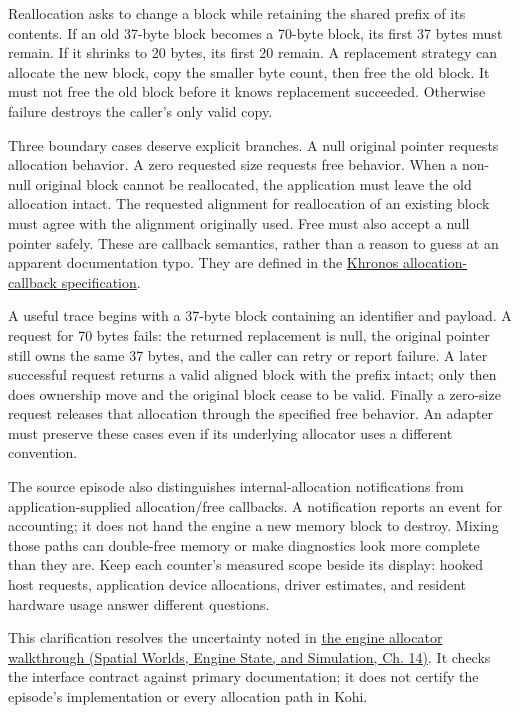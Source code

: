 Reallocation asks to change a block while retaining the shared prefix of its contents. If an old 37-byte block becomes a 70-byte block, its first 37 bytes must remain. If it shrinks to 20 bytes, its first 20 remain. A replacement strategy can allocate the new block, copy the smaller byte count, then free the old block. It must not free the old block before it knows replacement succeeded. Otherwise failure destroys the caller's only valid copy.

Three boundary cases deserve explicit branches. A null original pointer requests allocation behavior. A zero requested size requests free behavior. When a non-null original block cannot be reallocated, the application must leave the old allocation intact. The requested alignment for reallocation of an existing block must agree with the alignment originally used. Free must also accept a null pointer safely. These are callback semantics, rather than a reason to guess at an apparent documentation typo. They are defined in the \href{https://docs.vulkan.org/spec/latest/chapters/memory.html}{Khronos allocation-callback specification}.

A useful trace begins with a 37-byte block containing an identifier and payload. A request for 70 bytes fails: the returned replacement is null, the original pointer still owns the same 37 bytes, and the caller can retry or report failure. A later successful request returns a valid aligned block with the prefix intact; only then does ownership move and the original block cease to be valid. Finally a zero-size request releases that allocation through the specified free behavior. An adapter must preserve these cases even if its underlying allocator uses a different convention.

The source episode also distinguishes internal-allocation notifications from application-supplied allocation/free callbacks. A notification reports an event for accounting; it does not hand the engine a new memory block to destroy. Mixing those paths can double-free memory or make diagnostics look more complete than they are. Keep each counter's measured scope beside its display: hooked host requests, application device allocations, driver estimates, and resident hardware usage answer different questions.

This clarification resolves the uncertainty noted in \href{../05-Spatial-Worlds-Engine-State-and-Simulation/main.pdf\#nameddest=05-engine-i-ch014-bridge-vulkan-allocation-callbacks-to-an-engine-allocator}{the engine allocator walkthrough (Spatial Worlds, Engine State, and Simulation, Ch. 14)}. It checks the interface contract against primary documentation; it does not certify the episode's implementation or every allocation path in Kohi.

